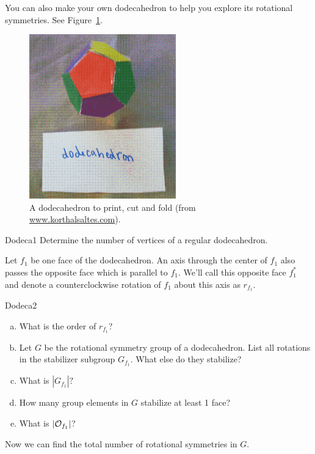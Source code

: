 You can also make your own dodecahedron to help you explore its rotational symmetries. See Figure~\ref{fig:DodecaFold}.

\begin{figure}[ht]
\begin{center}
\includegraphics[width=2.5in]{images/DodecahedronFold.png}
\caption{A dodecahedron to print, cut and fold (from \url{www.korthalsaltes.com}).}
 \label{fig:DodecaFold}
\end{center}
\end{figure}

\begin{exercise}{Dodeca1}
Determine the number of vertices of a regular dodecahedron.
\end{exercise}
Let $f_1$ be one face of the dodecahedron.  An axis through the center of $f_1$ also passes the opposite face which is parallel to $f_1$. We'll call this opposite face $f_1^*$ and denote a counterclockwise rotation of $f_1$ about this axis as $r_{f_1}$.

\begin{exercise}{Dodeca2}
\begin {enumerate}[(a)]
\item What is the order of $r_{f_1}$?
\item Let $G$ be the rotational symmetry group of a dodecahedron.  List all rotations in the stabilizer subgroup $G_{f_1}$.  What else do they stabilize?
\item What is $|G_{f_1}|?$
\item How many group elements in $G$ stabilize at least 1 face?
\item What is $|{\cal O}_{f_1}|$?
\end{enumerate}
\end{exercise}
Now we can find the total number of rotational symmetries in $G$.

